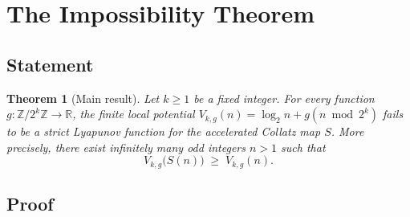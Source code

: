 \documentclass[11pt,a4paper]{article}
\newtheorem{theorem}{Theorem}[section]
\theoremstyle{definition}
\theoremstyle{remark}
\newcommand{\Z}{\mathbb{Z}}
\newcommand{\R}{\mathbb{R}}
\begin{document}
\section{The Impossibility Theorem}\label{sec:main}

\subsection{Statement}

\begin{theorem}[Main result]\label{thm:main}
Let $k \geq 1$ be a fixed integer.  For every function
$g \colon \Z / 2^k \Z \to \R$, the finite local potential
$V_{k, g}(n) = \log_2 n + g(n \bmod 2^k)$ fails to be a strict
Lyapunov function for the accelerated Collatz map $S$.  More precisely,
there exist infinitely many odd integers $n > 1$ such that
\[
  V_{k, g}\bigl(S(n)\bigr) \;\geq\; V_{k, g}(n).
\]
\end{theorem}

\subsection{Proof}
\end{document}
